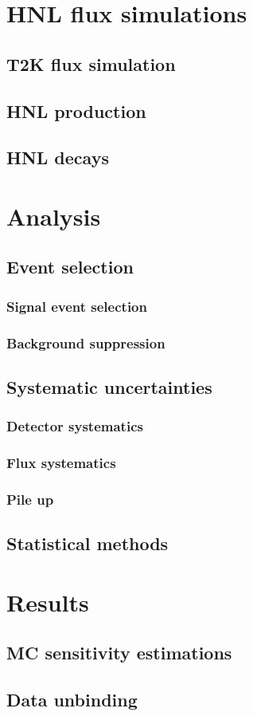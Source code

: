 \documentclass[../main.tex]{subfiles}
\begin{document}
\chapter{HNL flux simulations}
\section{T2K flux simulation}
\section{HNL production}
\section{HNL decays}
\chapter{Analysis}
\section{Event selection}
\subsection{Signal event selection}
\subsection{Background suppression}
\section{Systematic uncertainties}
\subsection{Detector systematics}
\subsection{Flux systematics}
\subsection{Pile up}
\section{Statistical methods}
\chapter{Results}
\section{MC sensitivity estimations}
\section{Data unbinding}
\end{document}
